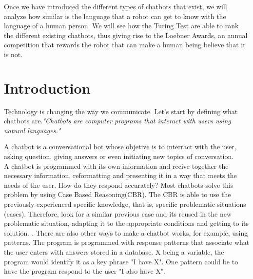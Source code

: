 \documentclass[12pt,twoside]{article}
\theoremstyle{plain}
\theoremstyle{definition}
\theoremstyle{remark}
\begin{document}
Once we have introduced the different types of chatbots that exist, we will analyze how similar is the language that a robot can get to know with the language of a human person. We will see how the Turing Test are able to rank the different existing chatbots, thus giving rise to the Loebner Awards, an annual competition that rewards the robot that can make a human being believe that it is not.

\setcounter{tocdepth}{2} 					%
\tableofcontents

\clearpage



\section{Introduction}
\label{sec:introduction}

Technology is changing the way we communicate. Let's start by defining what chatbots are.\textit{"Chatbots are computer programs that interact with users using natural languages."} \cite{shawar2007chatbots}

A chatbot is a conversational bot whose objetive is to interract with the user, asking question, giving answers or even initiating new topics of conversation. \cite{huang2007extracting} \\

A chatbot is programmed with its own information and recive together the necessary information, reformatting and presenting it in a way that meets the needs of the user. How do they respond accurately? Most chatbots solve this problem by using Case Based Reasoning(CBR). The CBR is able to use the previously experienced specific knowledge, that is, specific problematic situations (cases). Therefore, look for a similar previous case and its reused in the new problematic situation, adapting it to the appropriate conditions and getting to its solution. \cite{kolodner2014case}. There are also other ways to make a chatbot works, for example, using patterns. The program is programmed with response patterns that associate what the user enters with answers stored in a database. X being a variable, the program would identify it as a key phrase "I have X". One pattern could be to have the program respond to the user "I also have X". \\
\end{document}
